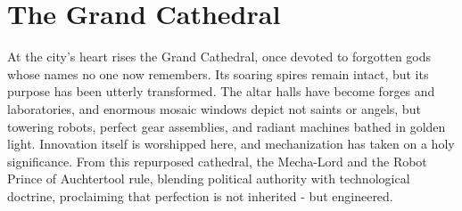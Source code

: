 \section*{The Grand Cathedral}
{\entryfont At the city's heart rises the Grand Cathedral, once devoted to forgotten gods whose names no one now remembers. Its soaring spires remain intact, but its purpose has been utterly transformed. The altar halls have become forges and laboratories, and enormous mosaic windows depict not saints or angels, but towering robots, perfect gear assemblies, and radiant machines bathed in golden light. Innovation itself is worshipped here, and mechanization has taken on a holy significance. From this repurposed cathedral, the Mecha-Lord and the Robot Prince of Auchtertool rule, blending political authority with technological doctrine, proclaiming that perfection is not inherited - but engineered.}

